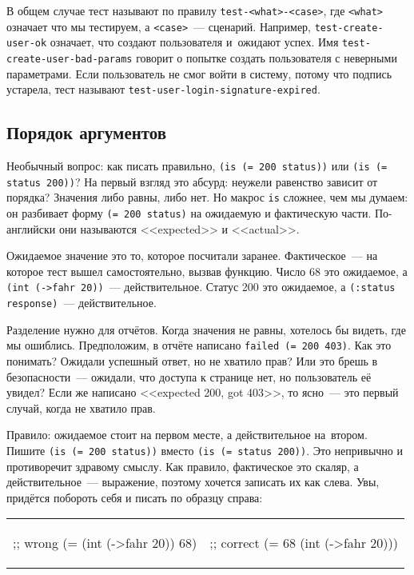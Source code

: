 В общем случае тест называют по правилу \verb|test-<what>-<case>|, где
\verb|<what>| означает что мы тестируем, а \verb|<case>|~--- сценарий. Например,
\verb|test-create-user-ok| означает, что создают пользователя и~ожидают
успех. Имя \verb|test-create-user-bad-params| говорит о попытке создать
пользователя с неверными параметрами. Если пользователь не смог войти в систему,
потому что подпись устарела, тест называют
\verb|test-user-login-signature-expired|.

\subsection{Порядок аргументов}


Необычный вопрос: как писать правильно, \verb|(is (= 200 status))| или
\verb|(is (= status 200))|? На первый взгляд это абсурд: неужели равенство
зависит от порядка? Значения либо равны, либо нет. Но макрос \verb|is|
сложнее, чем мы думаем: он разбивает форму \verb|(= 200 status)| на ожидаемую
и фактическую части. По-английски они называются <<expected>> и <<actual>>.

Ожидаемое значение это то, которое посчитали заранее. Фактическое~--- на которое
тест вышел самостоятельно, вызвав функцию. Число 68 это ожидаемое, а
\verb|(int (->fahr 20))|~--- действительное. Статус 200 это ожидаемое, а
\verb|(:status response)|~--- действительное.

Разделение нужно для отчётов. Когда значения не равны, хотелось бы видеть, где
мы ошиблись. Предположим, в отчёте написано \verb|failed (= 200 403)|. Как это
понимать? Ожидали успешный ответ, но не хватило прав? Или это брешь в
безопасности~--- ожидали, что доступа к странице нет, но пользователь её увидел?
Если же написано <<expected 200, got 403>>, то ясно~--- это первый случай, когда
не хватило прав.

Правило: ожидаемое стоит на первом месте, а действительное на~втором. Пишите
\verb|(is (= 200 status))| вместо \verb|(is (= status 200))|.
Это непривычно и противоречит здравому смыслу. Как правило, фактическое
это скаляр, а действительное~--- выражение, поэтому хочется записать их как слева.
Увы, придётся побороть себя и писать по образцу справа:

\noindent
\begin{tabular}{ @{}p{5cm} @{}p{5cm} }

\begin{english}
  \begin{clojure}
;; wrong
(= (int (->fahr 20)) 68)
  \end{clojure}
\end{english}

&

\begin{english}
  \begin{clojure}
;; correct
(= 68 (int (->fahr 20)))
  \end{clojure}
\end{english}

\end{tabular}

